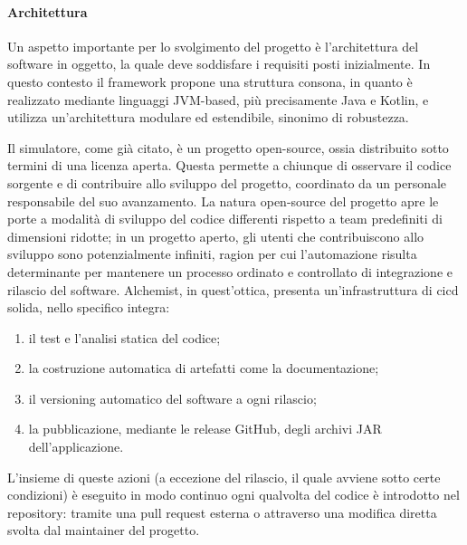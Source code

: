 \paragraph{Architettura} Un aspetto importante per lo svolgimento del progetto è l'architettura del software in oggetto, la quale deve soddisfare i requisiti posti inizialmente. In questo contesto il framework propone una struttura consona, in quanto è realizzato mediante linguaggi JVM-based, più precisamente Java e Kotlin, e utilizza un'architettura modulare ed estendibile, sinonimo di robustezza. 

Il simulatore, come già citato, è un progetto open-source, ossia distribuito sotto termini di una licenza aperta. Questa permette a chiunque di osservare il codice sorgente e di contribuire allo sviluppo del progetto, coordinato da un personale responsabile del suo avanzamento. La natura open-source del progetto apre le porte a modalità di sviluppo del codice differenti rispetto a team predefiniti di dimensioni ridotte; in un progetto aperto, gli utenti che contribuiscono allo sviluppo sono potenzialmente infiniti, ragion per cui l'automazione risulta determinante per mantenere un processo ordinato e controllato di integrazione e rilascio del software. Alchemist, in quest'ottica, presenta un'infrastruttura di \ac{cicd} solida, nello specifico integra:
\begin{enumerate}
	\item il test e l'analisi statica del codice;
	\item la costruzione automatica di artefatti come la documentazione;
	\item il versioning automatico del software a ogni rilascio;
	\item la pubblicazione, mediante le release GitHub, degli archivi JAR dell'applicazione.
\end{enumerate}
L'insieme di queste azioni (a eccezione del rilascio, il quale avviene sotto certe condizioni) è eseguito in modo continuo ogni qualvolta del codice è introdotto nel repository: tramite una pull request esterna o attraverso una modifica diretta svolta dal maintainer del progetto.

